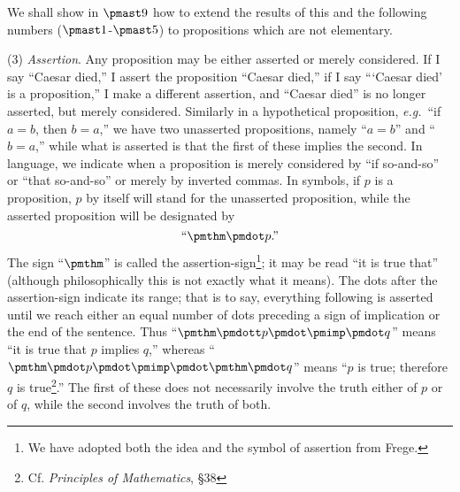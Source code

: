 \documentclass[letterpaper,12pt,openany,leqno]{book}
\begin{document}
We shall show in $\pmast9$ how to extend the results of this and the following numbers ($\pmast1$-$\pmast5$) to propositions which are not elementary.

(3) \textit{Assertion}. Any proposition may be either asserted or merely considered. If I say ``Caesar died,'' I assert the proposition ``Caesar died,'' if I say ```Caesar died' is a proposition,'' I make a different assertion, and ``Caesar died'' is no longer asserted, but merely considered. Similarly in a hypothetical proposition, \textit{e.g.}\ ``if $a=b$, then $b=a$,'' we have two unasserted propositions, namely ``$a=b$'' and ``$b=a$,'' while what is asserted is that the first of these implies the second. In language, we indicate when a proposition is merely considered by ``if so-and-so'' or ``that so-and-so'' or merely by inverted commas. In symbols, if $p$ is a proposition, $p$ by itself will stand for the unasserted proposition, while the asserted proposition will be designated by
\[
	\text{``}\pmthm\pmdot p\text{.''}
\]
The sign ``$\pmthm$'' is called the assertion-sign\footnote{We have adopted both the idea and the symbol of assertion from Frege.}; it may be read ``it is true that'' (although philosophically this is not exactly what it means). The dots after the assertion-sign indicate its range; that is to say, everything following is asserted until we reach either an equal number of dots preceding a sign of implication or the end of the sentence. Thus ``$\pmthm \pmdott p \pmdot \pmimp \pmdot q$'' means ``it is true that $p$ implies $q$,'' whereas ``$\pmthm \pmdot p \pmdot \pmimp \pmdot \pmthm \pmdot q$'' means ``$p$ is true; therefore $q$ is true\footnote{Cf. \textit{Principles of Mathematics}, \S38}.'' The first of these does not necessarily involve the truth either of $p$ or of $q$, while the second involves the truth of both.
\end{document}
